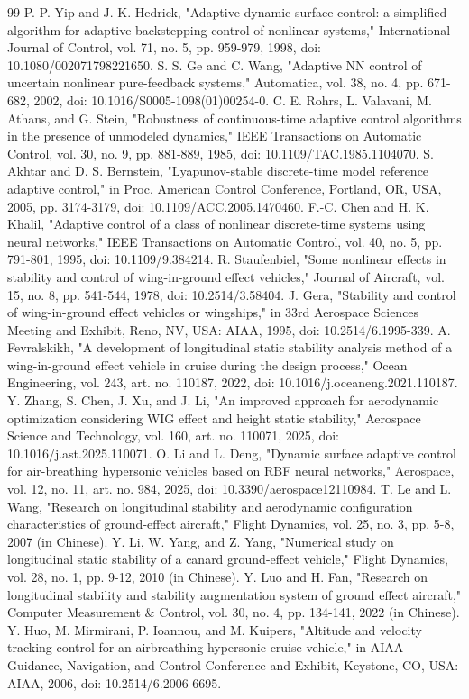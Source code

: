\documentclass[conference]{IEEEtran}
\begin{document}
\begin{thebibliography}{99}
 P. P. Yip and J. K. Hedrick, "Adaptive dynamic surface control: a simplified algorithm for adaptive backstepping control of nonlinear systems," International Journal of Control, vol. 71, no. 5, pp. 959-979, 1998, doi: 10.1080/002071798221650.
 S. S. Ge and C. Wang, "Adaptive NN control of uncertain nonlinear pure-feedback systems," Automatica, vol. 38, no. 4, pp. 671-682, 2002, doi: 10.1016/S0005-1098(01)00254-0.
 C. E. Rohrs, L. Valavani, M. Athans, and G. Stein, "Robustness of continuous-time adaptive control algorithms in the presence of unmodeled dynamics," IEEE Transactions on Automatic Control, vol. 30, no. 9, pp. 881-889, 1985, doi: 10.1109/TAC.1985.1104070.
 S. Akhtar and D. S. Bernstein, "Lyapunov-stable discrete-time model reference adaptive control," in Proc. American Control Conference, Portland, OR, USA, 2005, pp. 3174-3179, doi: 10.1109/ACC.2005.1470460.
 F.-C. Chen and H. K. Khalil, "Adaptive control of a class of nonlinear discrete-time systems using neural networks," IEEE Transactions on Automatic Control, vol. 40, no. 5, pp. 791-801, 1995, doi: 10.1109/9.384214.
 R. Staufenbiel, "Some nonlinear effects in stability and control of wing-in-ground effect vehicles," Journal of Aircraft, vol. 15, no. 8, pp. 541-544, 1978, doi: 10.2514/3.58404.
 J. Gera, "Stability and control of wing-in-ground effect vehicles or wingships," in 33rd Aerospace Sciences Meeting and Exhibit, Reno, NV, USA: AIAA, 1995, doi: 10.2514/6.1995-339.
 A. Fevralskikh, "A development of longitudinal static stability analysis method of a wing-in-ground effect vehicle in cruise during the design process," Ocean Engineering, vol. 243, art. no. 110187, 2022, doi: 10.1016/j.oceaneng.2021.110187.
 Y. Zhang, S. Chen, J. Xu, and J. Li, "An improved approach for aerodynamic optimization considering WIG effect and height static stability," Aerospace Science and Technology, vol. 160, art. no. 110071, 2025, doi: 10.1016/j.ast.2025.110071.
 O. Li and L. Deng, "Dynamic surface adaptive control for air-breathing hypersonic vehicles based on RBF neural networks," Aerospace, vol. 12, no. 11, art. no. 984, 2025, doi: 10.3390/aerospace12110984.
 T. Le and L. Wang, "Research on longitudinal stability and aerodynamic configuration characteristics of ground-effect aircraft," Flight Dynamics, vol. 25, no. 3, pp. 5-8, 2007 (in Chinese).
 Y. Li, W. Yang, and Z. Yang, "Numerical study on longitudinal static stability of a canard ground-effect vehicle," Flight Dynamics, vol. 28, no. 1, pp. 9-12, 2010 (in Chinese).
 Y. Luo and H. Fan, "Research on longitudinal stability and stability augmentation system of ground effect aircraft," Computer Measurement \& Control, vol. 30, no. 4, pp. 134-141, 2022 (in Chinese).
 Y. Huo, M. Mirmirani, P. Ioannou, and M. Kuipers, "Altitude and velocity tracking control for an airbreathing hypersonic cruise vehicle," in AIAA Guidance, Navigation, and Control Conference and Exhibit, Keystone, CO, USA: AIAA, 2006, doi: 10.2514/6.2006-6695.
\end{thebibliography}
\end{document}
